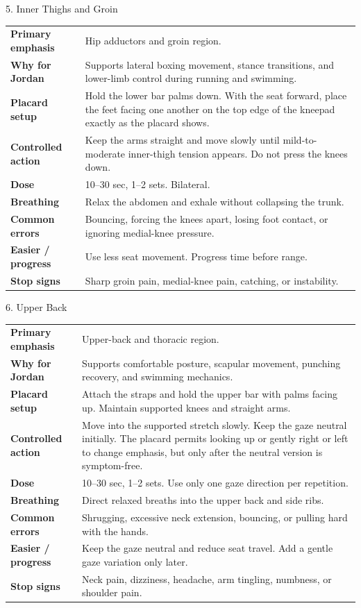 \documentclass[10pt,letterpaper]{article}
\begin{document}
\begin{stretchbox}{5. Inner Thighs and Groin}
\begin{tabularx}{\textwidth}{@{}L{1.28in}Y@{}}
\textbf{Primary emphasis} & Hip adductors and groin region. \\
\textbf{Why for Jordan} & Supports lateral boxing movement, stance transitions, and lower-limb control during running and swimming. \\
\textbf{Placard setup} & Hold the lower bar palms down. With the seat forward, place the feet facing one another on the top edge of the kneepad exactly as the placard shows. \\
\textbf{Controlled action} & Keep the arms straight and move slowly until mild-to-moderate inner-thigh tension appears. Do not press the knees down. \\
\textbf{Dose} & 10--30 sec, 1--2 sets. Bilateral. \\
\textbf{Breathing} & Relax the abdomen and exhale without collapsing the trunk. \\
\textbf{Common errors} & Bouncing, forcing the knees apart, losing foot contact, or ignoring medial-knee pressure. \\
\textbf{Easier / progress} & Use less seat movement. Progress time before range. \\
\textbf{Stop signs} & Sharp groin pain, medial-knee pain, catching, or instability. \\
\end{tabularx}
\end{stretchbox}

\begin{stretchbox}{6. Upper Back}
\begin{tabularx}{\textwidth}{@{}L{1.28in}Y@{}}
\textbf{Primary emphasis} & Upper-back and thoracic region. \\
\textbf{Why for Jordan} & Supports comfortable posture, scapular movement, punching recovery, and swimming mechanics. \\
\textbf{Placard setup} & Attach the straps and hold the upper bar with palms facing up. Maintain supported knees and straight arms. \\
\textbf{Controlled action} & Move into the supported stretch slowly. Keep the gaze neutral initially. The placard permits looking up or gently right or left to change emphasis, but only after the neutral version is symptom-free. \\
\textbf{Dose} & 10--30 sec, 1--2 sets. Use only one gaze direction per repetition. \\
\textbf{Breathing} & Direct relaxed breaths into the upper back and side ribs. \\
\textbf{Common errors} & Shrugging, excessive neck extension, bouncing, or pulling hard with the hands. \\
\textbf{Easier / progress} & Keep the gaze neutral and reduce seat travel. Add a gentle gaze variation only later. \\
\textbf{Stop signs} & Neck pain, dizziness, headache, arm tingling, numbness, or shoulder pain. \\
\end{tabularx}
\end{stretchbox}
\end{document}
